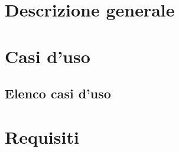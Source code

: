 \documentclass[a4paper, oneside, dvipsnames, table]{article}
\begin{document}
\copertina{}
\newpage



\fancydoc{}

\clearpage
\tableofcontents
\clearpage
\listoffigures
\clearpage



\section{Descrizione generale}


\section{Casi d'uso}

\clearpage
\subsection{Elenco casi d'uso}
\setcounter{secnumdepth}{0}


\section{Requisiti}

\end{document}
